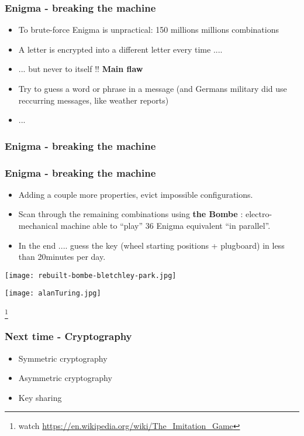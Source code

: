\documentclass[
hyperref={pdfpagelabels=false}
,xcolor=table
]
{beamer}
\begin{document}
\begin{frame}
  \frametitle{Enigma - breaking the machine}

  \begin{itemize}
  \item To brute-force Enigma is unpractical: 150 millions millions combinations
  \item A letter is encrypted into a different letter every time ....
  \item ... but never to itself !! \textbf{Main flaw}
  \item Try to guess a word or phrase in a message (and Germans military did use reccurring messages, like weather reports)
  \item ... 
  \end{itemize}

\end{frame}

\begin{frame} 
  \frametitle{Enigma - breaking the machine}
  \begin{center}
  \end{center}
\end{frame}

\begin{frame}[fragile]
  \frametitle{Enigma - breaking the machine}

  \begin{itemize}
  \item Adding a couple more properties, evict impossible configurations. 
  \item Scan through the remaining combinations using \textbf{the Bombe} : electro-mechanical machine able to ``play'' 36 Enigma equivalent ``in parallel''. 
  \item In the end .... guess the key (wheel starting positions + plugboard) in less than 20minutes per day. 
  \end{itemize}

  \begin{minipage}{0.45\textwidth}
    \texttt{[image: rebuilt-bombe-bletchley-park.jpg]}
  \end{minipage}
  \hfill
  \begin{minipage}{0.45\textwidth}
    \texttt{[image: alanTuring.jpg]}
  \end{minipage}

  \footnote{watch \url{https://en.wikipedia.org/wiki/The_Imitation_Game}}
  
\end{frame}


\begin{frame}
  \frametitle{Next time - Cryptography}
  \begin{itemize}
  \item Symmetric cryptography
  \item Asymmetric cryptography
  \item Key sharing
  \end{itemize}
  
\end{frame}
\end{document}
